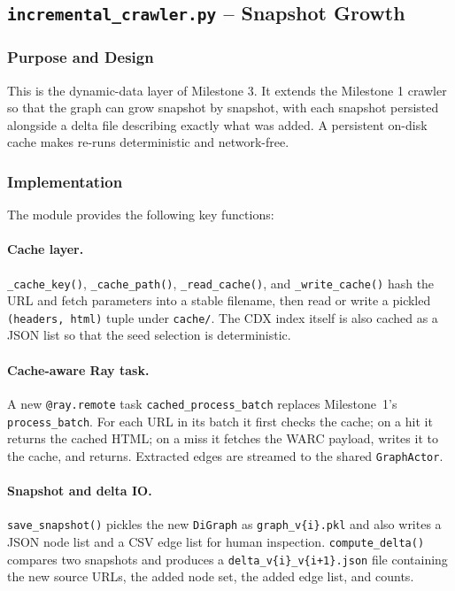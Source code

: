 \documentclass[11pt,a4paper]{article}
\begin{document}
\subsection{\texttt{incremental\_crawler.py} -- Snapshot Growth}

\subsubsection{Purpose and Design}
This is the dynamic-data layer of Milestone 3. It extends the Milestone 1
crawler so that the graph can grow snapshot by snapshot, with each
snapshot persisted alongside a delta file describing exactly what was
added. A persistent on-disk cache makes re-runs deterministic and
network-free.

\subsubsection{Implementation}
The module provides the following key functions:

\paragraph{Cache layer.} \texttt{\_cache\_key()}, \texttt{\_cache\_path()},
\texttt{\_read\_cache()}, and \texttt{\_write\_cache()} hash the URL and
fetch parameters into a stable filename, then read or write a pickled
\texttt{(headers, html)} tuple under \texttt{cache/}. The CDX index
itself is also cached as a JSON list so that the seed selection is
deterministic.

\paragraph{Cache-aware Ray task.} A new \texttt{@ray.remote} task
\texttt{cached\_process\_batch} replaces Milestone~1's
\texttt{process\_batch}. For each URL in its batch it first checks the
cache; on a hit it returns the cached HTML; on a miss it fetches the
WARC payload, writes it to the cache, and returns. Extracted edges are
streamed to the shared \texttt{GraphActor}.

\paragraph{Snapshot and delta IO.} \texttt{save\_snapshot()} pickles the
new \texttt{DiGraph} as \texttt{graph\_v\{i\}.pkl} and also writes a
JSON node list and a CSV edge list for human inspection.
\texttt{compute\_delta()} compares two snapshots and produces a
\texttt{delta\_v\{i\}\_v\{i+1\}.json} file containing the new source
URLs, the added node set, the added edge list, and counts.
\end{document}

